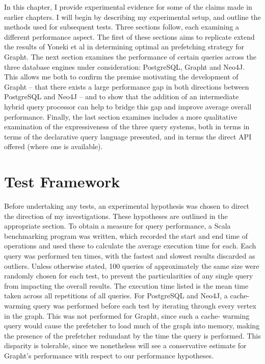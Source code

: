 
In this chapter, I provide experimental evidence for some of the claims made
in earlier chapters. I will begin by describing my experimental setup, and
outline the methods used for subsequent tests. Three sections follow, each
examining a different performance aspect. The first of these sections aims to
replicate extend the results of Yoneki et al\cite{crackle} in determining
optimal an prefetching strategy for Grapht. The next section examines the
performance of certain queries across the three database engines under
consideration: PostgreSQL, Grapht and Neo4J. This allows me both to confirm
the premise motivating the development of Grapht -- that there exists a large
performance gap in both directions between PostgreSQL and Neo4J -- and to show
that the addition of an intermediate hybrid query processor can help to bridge
this gap and improve average overall performance. Finally, the last section
examines includes a more qualitative examination of the expressiveness of the
three query systems, both in terms in terms of the declarative query language
presented, and in terms the direct API offered (where one is available).

\section{Test Framework}

Before undertaking any tests, an experimental hypothesis was chosen to direct
the direction of my investigations. These hypotheses are outlined in the
appropriate section. To obtain a measure for query performance, a Scala
benchmarking program was written, which recorded the start and end time of
operations and used these to calculate the average execution time for each.
Each  query was performed ten times, with the fastest and slowest results
discarded as outliers. Unless otherwise stated, 100 queries of approximately
the same size were randomly chosen for each test, to prevent the
particularities of any single query from impacting the overall results. The
execution time listed is the mean time taken across all repetitions of all
queries. For PostgreSQL and Neo4J, a cache-warming query was performed before
each test by iterating through every vertex in the graph. This was not
performed for Grapht, since such a cache- warming query would cause the
prefetcher to load much of the graph into memory, making  the presence of the
prefetcher redundant by the time the query is performed. This disparity is
tolerable, since we nonetheless will see  a conservative estimate for Grapht's
performance with respect to our performance hypotheses.

